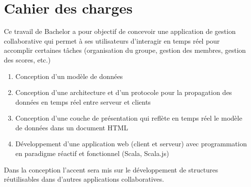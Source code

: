 \chapter{Cahier des charges}

Ce travail de Bachelor a pour objectif de concevoir une application de gestion collaborative qui permet à ses utilisateurs d'interagir en temps réel pour accomplir certaines tâches (organisation du groupe, gestion des membres, gestion des scores, etc.)

\begin{enumerate}
	\item Conception d'un modèle de données
	
	\item  Conception d'une architecture et d'un protocole pour la propagation des données en temps réel entre serveur et clients
	
	\item  Conception d'une couche de présentation qui reflète en temps réel le modèle de données dans un document HTML
	
	\item  Développement d'une application web (client et serveur) avec programmation en paradigme réactif et fonctionnel (Scala, Scala.js)
\end{enumerate}

Dans la conception l'accent sera mis sur le développement de structures réutilisables dans d'autres applications collaboratives.